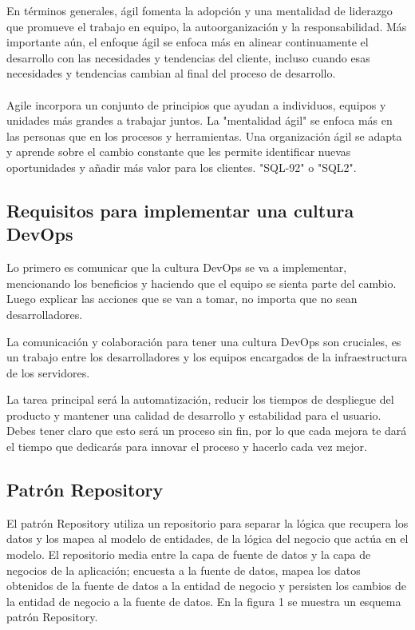 \documentclass[preprint,12pt]{elsarticle}
\begin{document}
En términos generales, ágil fomenta la adopción y una mentalidad de liderazgo que promueve el trabajo en equipo, la autoorganización y la responsabilidad. Más importante aún, el enfoque ágil se enfoca más en alinear continuamente el desarrollo con las necesidades y tendencias del cliente, incluso cuando esas necesidades y tendencias cambian al final del proceso de desarrollo.
\\
\\
Agile incorpora un conjunto de principios que ayudan a individuos, equipos y unidades más grandes a trabajar juntos. La "mentalidad ágil" se enfoca más en las personas que en los procesos y herramientas. Una organización ágil se adapta y aprende sobre el cambio constante que les permite identificar nuevas oportunidades y añadir más valor para los clientes. "SQL-92" o "SQL2".\cite{referenciarobles1}
\\

\subsection{Requisitos para implementar una cultura DevOps}
Lo primero es comunicar que la cultura DevOps se va a implementar, mencionando los beneficios y haciendo que el equipo se sienta parte del cambio. Luego explicar las acciones que se van a tomar, no importa que no sean desarrolladores.

La comunicación y colaboración para tener una cultura DevOps son cruciales, es un trabajo entre los desarrolladores y los equipos encargados de la infraestructura de los servidores.

La tarea principal será la automatización, reducir los tiempos de despliegue del producto y mantener una calidad de desarrollo y estabilidad para el usuario. Debes tener claro que esto será un proceso sin fin, por lo que cada mejora te dará el tiempo que dedicarás para innovar el proceso y hacerlo cada vez mejor.\cite{referenciarobles2}


\subsection{Patrón Repository}
El patrón Repository utiliza un repositorio para separar la lógica que recupera los datos y los mapea al modelo de entidades, de la lógica del negocio que actúa en el modelo. El repositorio media entre la capa de fuente de datos y la capa de negocios de la aplicación; encuesta a la fuente de datos, mapea los datos obtenidos de la fuente de datos a la entidad de negocio y persisten los cambios de la entidad de negocio a la fuente de datos. En la figura 1 se muestra un esquema patrón Repository.
\end{document}
